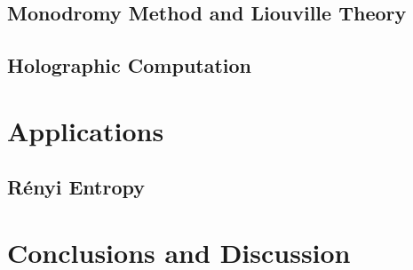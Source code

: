 \documentclass[a4paper,10pt]{article}
\begin{document}
  \subsection{Monodromy Method and Liouville Theory}
  \subsection{Holographic Computation}
  \section{Applications}
  \subsection{R\'enyi Entropy}
  \section{Conclusions and Discussion}
  
\end{document}
